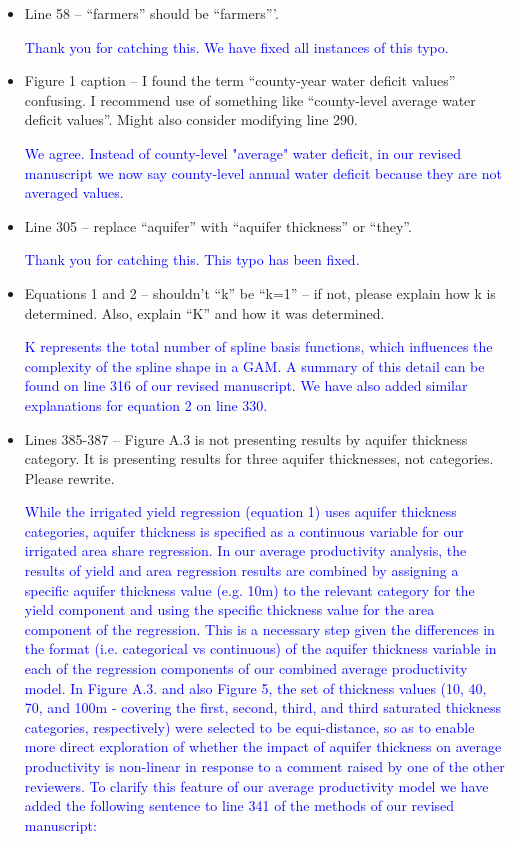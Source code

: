 \documentclass[
]{article}
\begin{document}
\begin{itemize}
    \item Line 58 – ``farmers'' should be ``farmers'''.

\textcolor{blue}{Thank you for catching this. We have fixed all instances of this typo.}

\item Figure 1 caption – I found the term ``county-year water deficit values'' confusing. I recommend use of something like ``county-level average water deficit values''. Might also consider modifying line 290.

\textcolor{blue}{We agree. Instead of county-level "average" water deficit, in our revised manuscript we now say county-level annual water deficit because they are not averaged values.}

\item Line 305 – replace ``aquifer'' with ``aquifer thickness'' or ``they''.

\textcolor{blue}{Thank you for catching this. This typo has been fixed.}

\item Equations 1 and 2 – shouldn't ``k'' be ``k=1'' – if not, please explain how k is determined. Also, explain ``K'' and how it was determined.

\textcolor{blue}{K represents the total number of spline basis functions, which influences the complexity of the spline shape in a GAM. A summary of this detail can be found on line 316 of our revised manuscript. We have also added similar explanations for equation 2 on line 330.}

\item Lines 385-387 – Figure A.3 is not presenting results by aquifer thickness category. It is presenting results for three aquifer thicknesses, not categories. Please rewrite.

\textcolor{blue}{While the irrigated yield regression (equation 1) uses aquifer thickness categories, aquifer thickness is specified as a continuous variable for our irrigated area share regression. In our average productivity analysis, the results of yield and area regression results are combined by assigning a specific aquifer thickness value (e.g. 10m) to the relevant category for the yield component and using the specific thickness value for the area component of the regression. This is a necessary step given the differences in the format (i.e. categorical vs continuous) of the aquifer thickness variable in each of the regression components of our combined average productivity model. In Figure A.3. and also Figure 5, the set of thickness values (10, 40, 70, and 100m - covering the first, second, third, and third saturated thickness categories, respectively) were selected to be equi-distance, so as to enable more direct exploration of whether the impact of aquifer thickness on average productivity is non-linear in response to a comment raised by one of the other reviewers. To clarify this feature of our average productivity model we have added the following sentence to line 341 of the methods of our revised manuscript:}


\end{itemize}
\end{document}
